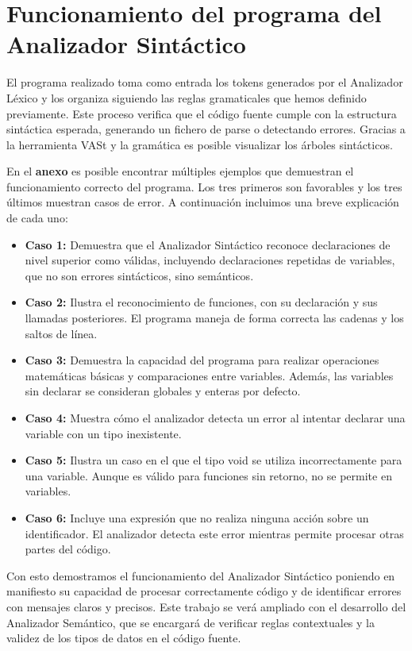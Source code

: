 \documentclass{article}
\begin{document}
\section{Funcionamiento del programa del Analizador Sintáctico}
El programa realizado toma como entrada los tokens generados por el Analizador Léxico y los organiza siguiendo las reglas gramaticales que hemos definido previamente. Este proceso verifica que el código fuente cumple con la estructura sintáctica esperada, generando un fichero de parse o detectando errores. Gracias a la herramienta VASt y la gramática es posible visualizar los árboles sintácticos.

En el \textbf{anexo} es posible encontrar múltiples ejemplos que demuestran el funcionamiento correcto del programa. Los tres primeros son favorables y los tres últimos muestran casos de error. A continuación incluimos una breve explicación de cada uno:

\begin{itemize}
    \item \textbf{Caso 1:} Demuestra que el Analizador Sintáctico reconoce declaraciones de nivel superior como válidas, incluyendo declaraciones repetidas de variables, que no son errores sintácticos, sino semánticos.

    \item \textbf{Caso 2:} Ilustra el reconocimiento de funciones, con su declaración y sus llamadas posteriores. El programa maneja de forma correcta las cadenas y los saltos de línea.
    
    \item \textbf{Caso 3:} Demuestra la capacidad del programa para realizar operaciones matemáticas básicas y comparaciones entre variables. Además, las variables sin declarar se consideran globales y enteras por defecto.
    
    \item \textbf{Caso 4:} Muestra cómo el analizador detecta un error al intentar declarar una variable con un tipo inexistente.
    
    \item \textbf{Caso 5:} Ilustra un caso en el que el tipo void se utiliza incorrectamente para una variable. Aunque es válido para funciones sin retorno, no se permite en variables.
    
    \item \textbf{Caso 6:} Incluye una expresión que no realiza ninguna acción sobre un identificador. El analizador detecta este error mientras permite procesar otras partes del código.
\end{itemize}

Con esto demostramos el funcionamiento del Analizador Sintáctico poniendo en manifiesto su capacidad de procesar correctamente código y de identificar errores con mensajes claros y precisos. Este trabajo se verá ampliado con el desarrollo del Analizador Semántico, que se encargará de verificar reglas contextuales y la validez de los tipos de datos en el código fuente.

\newpage


\newpage
\end{document}
